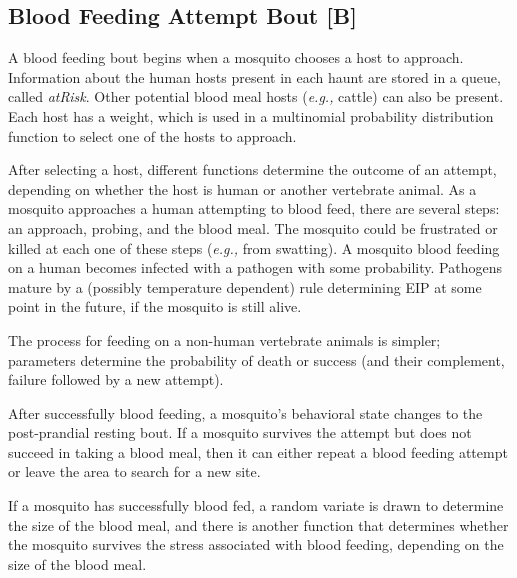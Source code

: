 \documentclass{article}
\newcommand{\eg}{{\em e.g., }}
\begin{document}
\begin{Schunk}
\end{Schunk}

\subsection{Blood Feeding Attempt Bout [B]}

A blood feeding bout begins when a mosquito chooses a host to
approach. Information about the human hosts present in each haunt
are stored in a queue, called {\em atRisk}. Other potential blood
meal hosts (\eg cattle) can also be present. Each host has a
weight, which is used in a multinomial probability distribution
function to select one of the hosts to approach.

After selecting a host, different functions determine the outcome
of an attempt, depending on whether the host is human or another
vertebrate animal. As a mosquito approaches a human attempting to
blood feed, there are several steps: an approach, probing, and
the blood meal. The mosquito could be frustrated or killed at
each one of these steps (\eg from swatting). A mosquito blood
feeding on a human becomes infected with a pathogen with some
probability. Pathogens mature by a (possibly temperature
dependent) rule determining EIP at some point in the future, if
the mosquito is still alive.

The process for feeding on a non-human vertebrate animals is
simpler; parameters determine the probability of death or success
(and their complement, failure followed by a new attempt).

After successfully blood feeding, a mosquito's behavioral state
changes to the post-prandial resting bout. If a mosquito survives
the attempt but does not succeed in taking a blood meal, then it
can either repeat a blood feeding attempt or leave the area to
search for a new site.

If a mosquito has successfully blood fed, a random variate is
drawn to determine the size of the blood meal, and there is
another function that determines whether the mosquito survives
the stress associated with blood feeding, depending on the size
of the blood meal.
\end{document}
